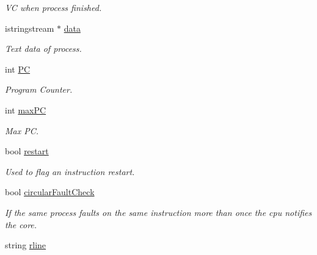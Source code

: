 \begin{DoxyCompactItemize}
\begin{DoxyCompactList}\small\item\em \-V\-C when process finished. \end{DoxyCompactList}\item 
\hypertarget{structsProc_adc5c77141ef1d0ce31aef263f5085871}{istringstream $\ast$ \hyperlink{structsProc_adc5c77141ef1d0ce31aef263f5085871}{data}}\label{d4/d8e/structsProc_adc5c77141ef1d0ce31aef263f5085871}

\begin{DoxyCompactList}\small\item\em \-Text data of process. \end{DoxyCompactList}\item 
\hypertarget{structsProc_a1c3a52cf9c8388b00fddeff11faec8ed}{int \hyperlink{structsProc_a1c3a52cf9c8388b00fddeff11faec8ed}{\-P\-C}}\label{d4/d8e/structsProc_a1c3a52cf9c8388b00fddeff11faec8ed}

\begin{DoxyCompactList}\small\item\em \-Program \-Counter. \end{DoxyCompactList}\item 
int \hyperlink{structsProc_a915cc193d810601697481767854a9b05}{max\-P\-C}
\begin{DoxyCompactList}\small\item\em \-Max \-P\-C. \end{DoxyCompactList}\item 
\hypertarget{structsProc_af4083409a9efd6e6eeafcf918e72423d}{bool \hyperlink{structsProc_af4083409a9efd6e6eeafcf918e72423d}{restart}}\label{d4/d8e/structsProc_af4083409a9efd6e6eeafcf918e72423d}

\begin{DoxyCompactList}\small\item\em \-Used to flag an instruction restart. \end{DoxyCompactList}\item 
\hypertarget{structsProc_af173141c3ed2ea7cfa2fb571e7c8a52a}{bool \hyperlink{structsProc_af173141c3ed2ea7cfa2fb571e7c8a52a}{circular\-Fault\-Check}}\label{d4/d8e/structsProc_af173141c3ed2ea7cfa2fb571e7c8a52a}

\begin{DoxyCompactList}\small\item\em \-If the same process faults on the same instruction more than once the cpu notifies the core. \end{DoxyCompactList}\item 
\hypertarget{structsProc_a82699971a08c9889bb70cdb000c2a65a}{string \hyperlink{structsProc_a82699971a08c9889bb70cdb000c2a65a}{rline}}\label{d4/d8e/structsProc_a82699971a08c9889bb70cdb000c2a65a}


\end{DoxyCompactItemize}
